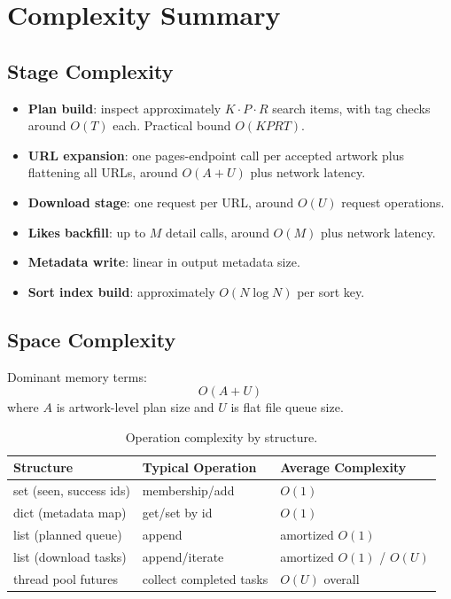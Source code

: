 \documentclass[11pt]{article}
\begin{document}
\section{Complexity Summary}
\subsection{Stage Complexity}
\begin{itemize}
    \item \textbf{Plan build}: inspect approximately $K \cdot P \cdot R$ search items, with tag checks around $O(T)$ each. Practical bound $O(KPRT)$.
    \item \textbf{URL expansion}: one pages-endpoint call per accepted artwork plus flattening all URLs, around $O(A + U)$ plus network latency.
    \item \textbf{Download stage}: one request per URL, around $O(U)$ request operations.
    \item \textbf{Likes backfill}: up to $M$ detail calls, around $O(M)$ plus network latency.
    \item \textbf{Metadata write}: linear in output metadata size.
    \item \textbf{Sort index build}: approximately $O(N \log N)$ per sort key.
\end{itemize}

\subsection{Space Complexity}
Dominant memory terms:
\[
O(A + U)
\]
where $A$ is artwork-level plan size and $U$ is flat file queue size.

\begin{table}[htbp]
\centering
\begin{tabular}{@{}lll@{}}
\toprule
Structure & Typical Operation & Average Complexity \\
\midrule
set (seen, success ids) & membership/add & $O(1)$ \\
dict (metadata map) & get/set by id & $O(1)$ \\
list (planned queue) & append & amortized $O(1)$ \\
list (download tasks) & append/iterate & amortized $O(1)$ / $O(U)$ \\
thread pool futures & collect completed tasks & $O(U)$ overall \\
\bottomrule
\end{tabular}
\caption{Operation complexity by structure.}
\end{table}
\end{document}
